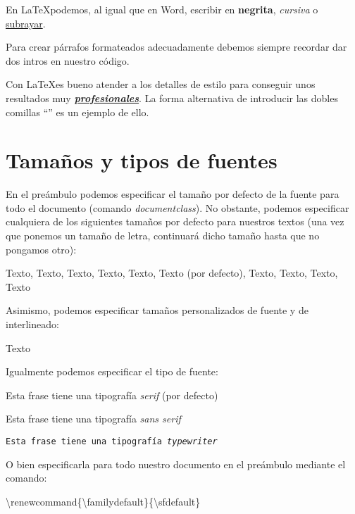 \documentclass[12pt]{book} %
\begin{document}
En \LaTeX podemos,  al igual que en Word, escribir en \textbf{negrita}, \emph{cursiva} o \underline{subrayar}.

Para crear párrafos formateados adecuadamente debemos siempre recordar dar dos intros en nuestro código.

Con \LaTeX es bueno atender a los detalles de estilo para conseguir unos resultados muy \textbf{\underline{\emph{profesionales}}}. La forma alternativa de introducir las dobles comillas ``'' es un ejemplo de ello.

\section{Tamaños y tipos de fuentes}

En el preámbulo podemos especificar el tamaño por defecto de la fuente para todo el documento (comando \emph{documentclass}). No obstante, podemos especificar cualquiera de los siguientes tamaños por defecto para nuestros textos (una vez que ponemos un tamaño de letra, continuará dicho tamaño hasta que no pongamos otro):

\Huge Texto, \huge  Texto, \LARGE Texto, \Large Texto, \large Texto, \normalsize Texto (por defecto), \small Texto, \footnotesize Texto, \scriptsize Texto, \tiny Texto

\normalsize %

Asimismo, podemos especificar tamaños personalizados de fuente y de interlineado:

\fontsize{22pt}{1cm}\selectfont Texto

\normalsize %

Igualmente podemos especificar el tipo de fuente: 

\textrm{Esta frase tiene una tipografía \emph{serif} (por defecto)}

\textsf{Esta frase tiene una tipografía \emph{sans serif}}

\texttt{Esta frase tiene una tipografía \emph{typewriter}}

O bien especificarla para todo nuestro documento en el preámbulo mediante el comando: %

\textbackslash renewcommand\{\textbackslash familydefault\}\{\textbackslash sfdefault\}
\end{document}
